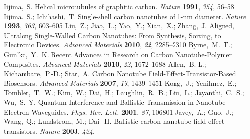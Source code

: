 \documentclass[journal=nalefd,manuscript=article,layout=twocolumn]{achemso}
\begin{document}
\begin{mcitethebibliography}{48}
Iijima,~S. Helical microtubules of graphitic carbon. \emph{Nature}
  \textbf{1991}, \emph{354}, 56--58\relax
\mciteBstWouldAddEndPuncttrue
\mciteSetBstMidEndSepPunct{\mcitedefaultmidpunct}
{\mcitedefaultendpunct}{\mcitedefaultseppunct}\relax
\EndOfBibitem
{}
Iijima,~S.; Ichihashi,~T. Single-shell carbon nanotubes of 1-nm diameter.
  \emph{Nature} \textbf{1993}, \emph{363}, 603--605\relax
\mciteBstWouldAddEndPuncttrue
\mciteSetBstMidEndSepPunct{\mcitedefaultmidpunct}
{\mcitedefaultendpunct}{\mcitedefaultseppunct}\relax
\EndOfBibitem
{}
Liu,~Z.; Jiao,~L.; Yao,~Y.; Xian,~X.; Zhang,~J. Aligned, Ultralong
  Single-Walled Carbon Nanotubes: From Synthesis, Sorting, to Electronic
  Devices. \emph{Advanced Materials} \textbf{2010}, \emph{22}, 2285--2310\relax
\mciteBstWouldAddEndPuncttrue
\mciteSetBstMidEndSepPunct{\mcitedefaultmidpunct}
{\mcitedefaultendpunct}{\mcitedefaultseppunct}\relax
\EndOfBibitem
{}
Byrne,~M.~T.; Gun'ko,~Y.~K. Recent Advances in Research on Carbon
  Nanotube-Polymer Composites. \emph{Advanced Materials} \textbf{2010},
  \emph{22}, 1672--1688\relax
\mciteBstWouldAddEndPuncttrue
\mciteSetBstMidEndSepPunct{\mcitedefaultmidpunct}
{\mcitedefaultendpunct}{\mcitedefaultseppunct}\relax
\EndOfBibitem
{}
Allen,~B.-L.; Kichambare,~P.-D.; Star,~A. Carbon Nanotube
  Field-Effect-Transistor-Based Biosensors. \emph{Advanced Materials}
  \textbf{2007}, \emph{19}, 1439--1451\relax
\mciteBstWouldAddEndPuncttrue
\mciteSetBstMidEndSepPunct{\mcitedefaultmidpunct}
{\mcitedefaultendpunct}{\mcitedefaultseppunct}\relax
\EndOfBibitem
{}
Kong,~J.; Yenilmez,~E.; Tombler,~T.~W.; Kim,~W.; Dai,~H.; Laughlin,~R.~B.;
  Liu,~L.; Jayanthi,~C.~S.; Wu,~S.~Y. Quantum Interference and Ballistic
  Transmission in Nanotube Electron Waveguides. \emph{Phys. Rev. Lett.}
  \textbf{2001}, \emph{87}, 106801\relax
\mciteBstWouldAddEndPuncttrue
\mciteSetBstMidEndSepPunct{\mcitedefaultmidpunct}
{\mcitedefaultendpunct}{\mcitedefaultseppunct}\relax
\EndOfBibitem
{}
Javey,~A.; Guo,~J.; Wang,~Q.; Lundstrom,~M.; Dai,~H. Ballistic carbon nanotube
  field-effect transistors. \emph{Nature} \textbf{2003}, \emph{424},

\end{mcitethebibliography}
\end{document}
